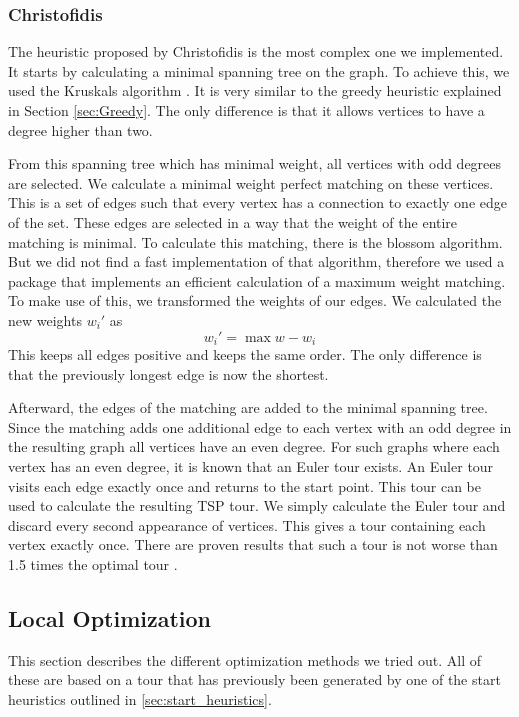\documentclass{article}
\begin{document}
\subsubsection{Christofidis}
The heuristic proposed by Christofidis \cite{balas1981restricted} is the most complex one we implemented. It starts by calculating a minimal spanning tree on the graph. To achieve this, we used the Kruskals algorithm \cite{kruskalShortestSpanningSubtree1956}. It is very similar to the greedy heuristic explained in Section \ref{sec:Greedy}. The only difference is that it allows vertices to have a degree higher than two.

From this spanning tree which has minimal weight, all vertices with odd degrees are selected. We calculate a minimal weight perfect matching on these vertices. This is a set of edges such that every vertex has a connection to exactly one edge of the set. These edges are selected in a way that the weight of the entire matching is minimal. To calculate this matching, there is the blossom algorithm. But we did not find a fast implementation of that algorithm, therefore we used a package that implements an efficient calculation of a maximum weight matching. To make use of this, we transformed the weights of our edges. We calculated the new weights $w_i'$ as 
$$w_i'= \max w - w_i$$
This keeps all edges positive and keeps the same order. The only difference is that the previously longest edge is now the shortest.

Afterward, the edges of the matching are added to the minimal spanning tree. Since the matching adds one additional edge to each vertex with an odd degree in the resulting graph all vertices have an even degree. For such graphs where each vertex has an even degree, it is known that an Euler tour exists. An Euler tour visits each edge exactly once and returns to the start point. This tour can be used to calculate the resulting TSP tour. We simply calculate the Euler tour and discard every second appearance of vertices. This gives a tour containing each vertex exactly once. There are proven results that such a tour is not worse than 1.5 times the optimal tour \cite{lecture_notes}.

\subsection{Local Optimization}
This section describes the different optimization methods we tried out. All of these are based on a tour that has previously been generated by one of the start heuristics outlined in \ref{sec:start_heuristics}.
\end{document}

